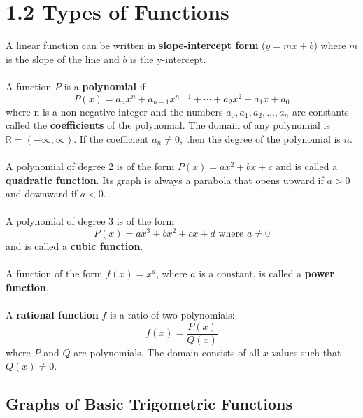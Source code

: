 %
%

\section*{1.2 Types of Functions}

A linear function can be written in \textbf{slope-intercept form} (\(y=mx+b\)) where \(m\) is the slope of the line and \(b\) is the y-intercept.
\\\\
A function \(P\) is a \textbf{polynomial} if 
$$P(x)=a_n{x}^n+a_{n-1}x^{n-1}+ \cdots +a_2x^2+a_1x+a_0$$
where n is a non-negative integer and the numbers \(a_0, a_1, a_2, \ldots ,a_n\) are constants called the \textbf{coefficients} of the polynomial. The domain of any polynomial is \(\mathbb{R} = (-\infty, \infty)\). If the coefficient \(a_n \neq 0\), then the degree of the polynomial is \(n\).
\\\\
A polynomial of degree 2 is of the form \(P(x)=ax^2+bx+c\) and is called a \textbf{quadratic function}. Its graph is always a parabola that opens upward if \(a > 0\) and downward if \(a < 0\).
\\\\
A polynomial of degree 3 is of the form 
\[ P(x)=ax^3+bx^2+cx+d \text{ where } a \neq 0 \]
and is called a \textbf{cubic function}.
\\\\
A function of the form \(f(x) = x^a\), where \(a\) is a constant, is called a \textbf{power function}.
\\\\
A \textbf{rational function} \(f\) is a ratio of two polynomials:
\[ f(x)=\frac{P(x)}{Q(x)} \]
where \(P\) and \(Q\) are polynomials. The domain consists of all \(x\)-values such that \( Q(x) \neq 0 \).

\subsection*{Graphs of Basic Trigometric Functions}

